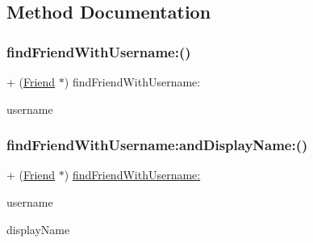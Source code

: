 \subsection{Method Documentation}
\hypertarget{interface_snap_read_a9ea52ef4b82202a8d3b03fb3f3269bce}{}\label{interface_snap_read_a9ea52ef4b82202a8d3b03fb3f3269bce} 
\subsubsection{\texorpdfstring{find\+Friend\+With\+Username\+:()}{findFriendWithUsername:()}}
{\footnotesize\ttfamily + (\hyperlink{interface_friend}{Friend} $\ast$) find\+Friend\+With\+Username\+: \begin{DoxyParamCaption}\item[{(N\+S\+String $\ast$)}]{username }\end{DoxyParamCaption}}

\hypertarget{interface_snap_read_aa9519f2ed3e05cf57b6feec74e6cd4b2}{}\label{interface_snap_read_aa9519f2ed3e05cf57b6feec74e6cd4b2} 
\subsubsection{\texorpdfstring{find\+Friend\+With\+Username\+:and\+Display\+Name\+:()}{findFriendWithUsername:andDisplayName:()}}
{\footnotesize\ttfamily + (\hyperlink{interface_friend}{Friend} $\ast$) \hyperlink{interface_snap_read_a9ea52ef4b82202a8d3b03fb3f3269bce}{find\+Friend\+With\+Username\+:} \begin{DoxyParamCaption}\item[{(N\+S\+String $\ast$)}]{username }\item[{andDisplayName:(N\+S\+String $\ast$)}]{display\+Name }\end{DoxyParamCaption}}

\hypertarget{interface_snap_read_a9b72eb8481516f541f4d9447ae335a63}{}\label{interface_snap_read_a9b72eb8481516f541f4d9447ae335a63} 

